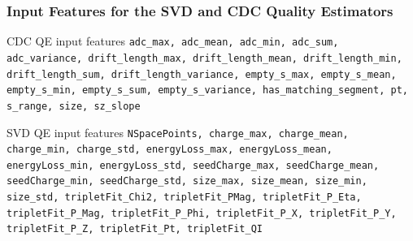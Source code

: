 \documentclass[18pt, aspectratio=169]{beamer}
\begin{document}
\begin{frame}
  \frametitle{Input Features for the SVD and CDC Quality Estimators}
  \begin{block}{CDC QE input features}
    \texttt{\scriptsize adc\_max, adc\_mean, adc\_min, adc\_sum, adc\_variance, drift\_length\_max,
      drift\_length\_mean, drift\_length\_min, drift\_length\_sum, drift\_length\_variance, empty\_s\_max,
      empty\_s\_mean, empty\_s\_min, empty\_s\_sum, empty\_s\_variance, has\_matching\_segment, pt, s\_range,
      size, sz\_slope}
  \end{block}
  \begin{block}{SVD QE input features}
    \texttt{\scriptsize NSpacePoints, charge\_max, charge\_mean, charge\_min, charge\_std,
      energyLoss\_max, energyLoss\_mean, energyLoss\_min, energyLoss\_std, seedCharge\_max,
      seedCharge\_mean, seedCharge\_min, seedCharge\_std, size\_max, size\_mean, size\_min, size\_std,
      tripletFit\_Chi2, tripletFit\_PMag, tripletFit\_P\_Eta, tripletFit\_P\_Mag, tripletFit\_P\_Phi,
      tripletFit\_P\_X, tripletFit\_P\_Y, tripletFit\_P\_Z, tripletFit\_Pt, tripletFit\_QI}
  \end{block}

\end{frame}
\end{document}
